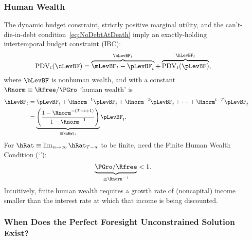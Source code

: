 \documentclass[ProjectDLO]{subfiles}
\begin{document}
\subsubsection{Human Wealth}
The dynamic budget constraint, strictly positive marginal utility, and the can't-die-in-debt condition~\eqref{eq:NoDebtAtDeath} imply an exactly-holding intertemporal budget constraint (IBC):
\begin{align}
  \mathrm{PDV}_{t}(\cLevBF)  & = \overbrace{\mLevBF_{t}-\pLevBF_{t}}^{\bLevBF_{t}}+\overbrace{\mathrm{PDV}_{t}(\pLevBF)}^{\hLevBF_{t}}, \label{eq:IBCFinite}
\end{align} \hypertarget{FHWF}{}
where $\bLevBF$ is nonhuman wealth, and with a constant $\Rnorm \equiv \Rfree/\PGro$ `human wealth' is
\begin{align}
  \hLevBF_{t}  & = \pLevBF_{t}+\Rnorm^{-1} \pLevBF_{t} + \Rnorm^{-2} \pLevBF_{t} + \cdots + \Rnorm^{t-T} \pLevBF_{t} \notag
  \\  & = \underbrace{\left(\frac{1-\Rnorm^{-(T-t+1)}}{1-\Rnorm^{-1}}\right)}_{\equiv \hRat_{t}}\pLevBF_{t} \label{eq:HDef}.
\end{align}\hypertarget{FHWC}{}
For $\hRat \equiv \lim_{n \rightarrow \infty} \hRat_{T-n}$ to be finite, need the Finite Human Wealth Condition (`\FHWC'):
\begin{align}
  \underbrace{\PGro/\Rfree}_{\equiv \Rnorm^{-1}}  & < 1 \label{eq:FHWC}.
\end{align}
Intuitively, finite human wealth requires a growth rate of (noncapital) income smaller than the interest rate at which that income is being discounted.

\hypertarget{Unconstrained-Solution}{}\hypertarget{PF-Unconstrained-Solution}{}
\subsubsection{When Does the Perfect Foresight Unconstrained Solution Exist?}\label{subsec:PFUncon}
\hypertarget{APF}{}\hypertarget{AIC}{}
\end{document}

